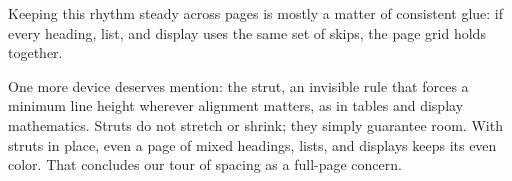 \documentclass[11pt]{article}
\begin{document}
Keeping this rhythm steady across pages is mostly a matter of consistent
glue: if every heading, list, and display uses the same set of skips, the
page grid holds together.

One more device deserves mention: the strut, an invisible rule that forces
a minimum line height wherever alignment matters, as in tables and display
mathematics. Struts do not stretch or shrink; they simply guarantee room.
With struts in place, even a page of mixed headings, lists, and displays
keeps its even color. That concludes our tour of
spacing as a full-page concern.
\end{document}
